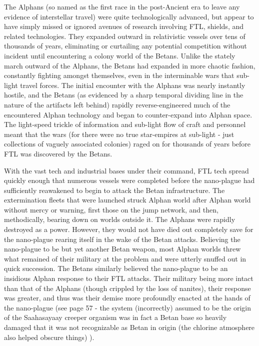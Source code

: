 The Alphans (so named as the first race in the post-Ancient era to
leave any evidence of interstellar travel) were quite technologically
advanced, but appear to have simply missed or ignored avenues of
research involving FTL, shields, and related technologies. They
expanded outward in relativistic vessels over tens of thousands of
years, eliminating or curtailing any potential competition without
incident until encountering a colony world of the Betans. Unlike the
stately march outward of the Alphans, the Betans had expanded in more
chaotic fashion, constantly fighting amongst themselves, even in the
interminable wars that sub-light travel forces. The initial encounter
with the Alphans was nearly instantly hostile, and the Betans (as
evidenced by a sharp temporal dividing line in the nature of the
artifacts left behind) rapidly reverse-engineered much of the
encountered Alphan technology and began to counter-expand into Alphan
space. The light-speed trickle of information and sub-light flow of
craft and personnel meant that the wars (for there were no true
star-empires at sub-light - just collections of vaguely associated
colonies) raged on for thousands of years before FTL was discovered by
the Betans.

With the vast tech and industrial bases under their command, FTL tech
spread quickly enough that numerous vessels were completed before the
nano-plague had sufficiently reawakened to begin to attack the Betan
infrastructure. The extermination fleets that were launched struck
Alphan world after Alphan world without mercy or warning, first those
on the jump network, and then, methodically, bearing down on worlds
outside it. The Alphans were rapidly destroyed as a power. However,
they would not have died out completely save for the nano-plague
rearing itself in the wake of the Betan attacks. Believing the
nano-plague to be but yet another Betan weapon, most Alphan worlds
threw what remained of their military at the problem and were utterly
snuffed out in quick succession. The Betans similarly believed the
nano-plague to be an insidious Alphan response to their FTL
attacks. Their military being more intact than that of the Alphans
(though crippled by the loss of nanites), their response was greater,
and thus was their demise more profoundly enacted at the hands of the
nano-plague (see page 57 - the system (incorrectly) assumed to be the
origin of the Saahasayaay creeper organism was in fact a Betan base so
heavily damaged that it was not recognizable as Betan in origin (the
chlorine atmosphere also helped obscure things) ).

